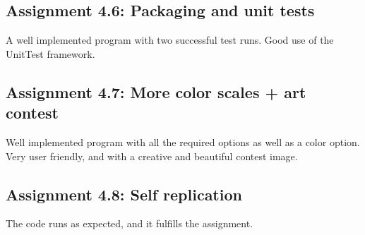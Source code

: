 \documentclass[a4paper]{article}
\begin{document}
\subsection*{Assignment 4.6:  Packaging and unit tests}
A well implemented program with two successful test runs. Good use of the UnitTest framework. 


\subsection*{Assignment 4.7: More color scales + art contest}
Well implemented program with all the required options as well as a color option. Very user friendly, and with a creative and beautiful contest image.  

\subsection*{Assignment 4.8: Self replication}
The code runs as expected, and it fulfills the assignment.




\end{document}
